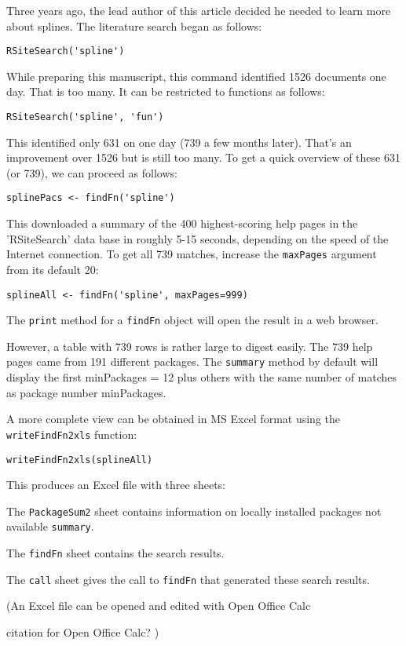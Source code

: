 Three years ago, the lead author of this article decided he 
needed to learn more about splines.  The literature search 
began as follows:  
\begin{verbatim}
RSiteSearch('spline')
\end{verbatim}
While preparing this manuscript, this command identified 
1526 documents one day.  That is too many.  It can be 
restricted to functions as follows:  
\begin{verbatim}
RSiteSearch('spline', 'fun')
\end{verbatim}
This identified only 631 on one day (739 a few months later).  
That's an improvement over 1526 but is still too many.  
To get a quick overview of these 631 (or 739), we can proceed 
as follows:
\begin{verbatim}
splinePacs <- findFn('spline')
\end{verbatim}
This downloaded a summary of the 400 highest-scoring help pages 
in the 'RSiteSearch' data base in roughly 5-15 seconds, depending 
on the speed of the Internet connection.  To get all 739 matches, 
increase the {\tt maxPages} argument from its default 20:  
\begin{verbatim}
splineAll <- findFn('spline', maxPages=999)
\end{verbatim}
The {\tt print} method for a {\tt findFn} object 
will open the result in a web browser.

However, a table with 739 rows is rather large to digest easily.
The 739 help pages came from 191 different packages.  The 
{\tt summary} method by default will display the first 
minPackages = 12 plus others with the same number of matches as 
package number minPackages.  

A more complete view can be obtained in MS Excel format 
using the {\tt writeFindFn2xls} function:  
\begin{verbatim}
writeFindFn2xls(splineAll)
\end{verbatim}
This produces an Excel file with three sheets:  

The {\tt PackageSum2} sheet contains information on locally 
installed packages not available {\tt summary}.  

The {\tt findFn} sheet contains the search results.  

The {\tt call} sheet gives the call to {\tt findFn} 
that generated these search results.  

(An Excel file can be opened and edited with Open Office
Calc


citation for Open Office Calc?
)

